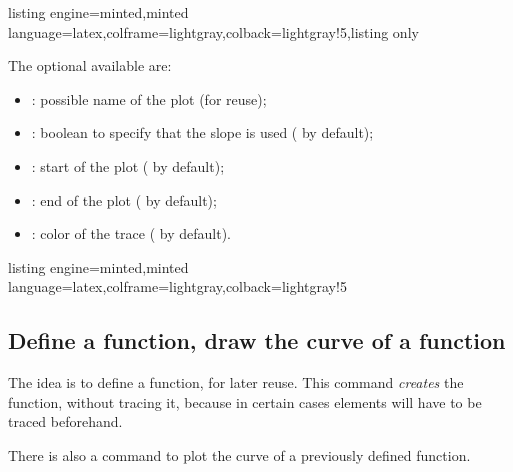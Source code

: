 \documentclass[11pt,a4paper]{ltxdoc}
\begin{document}
\begin{tcblisting}{listing engine=minted,minted language=latex,colframe=lightgray,colback=lightgray!5,listing only}
\end{tcblisting}

The optional \MontreCode{[keys]} available are:

\smallskip

\begin{itemize}
	\item {}: possible name of the plot (for reuse);
	\item {}: boolean to specify that the slope is used ( by default);
	\item {}: start of the plot ( by default);
	\item {}: end of the plot ( by default);
	\item {}: color of the trace ( by default).
\end{itemize}

\begin{tcblisting}{listing engine=minted,minted language=latex,colframe=lightgray,colback=lightgray!5}
\begin{GraphTikz}%
	[x=0.8cm,y=1cm,Xmin=-7,Xmax=4,Ymin=-3,Ymax=5]
\end{GraphTikz}
\end{tcblisting}

\pagebreak

\subsection{Define a function, draw the curve of a function}\label{deftracfct}

The idea is to define a function, for later reuse. This command \textit{creates} the function, without tracing it, because in certain cases elements will have to be traced beforehand.

\smallskip

There is also a command to plot the curve of a previously defined function.
\end{document}
